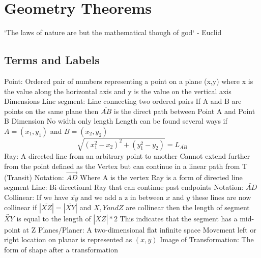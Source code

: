 \documentclass[12pt]{article}
\begin{document}
    \section {Geometry Theorems}
        `The laws of nature are but the mathematical though of god` - Euclid
        \subsection{Terms and Labels}
        \begin{outline}[enumerate]
            \1 Point: Ordered pair of numbers representing a point on a plane
                \2 (x,y) where x is the value along the horizontal axis and y is the value on the vertical axis
                 Dimensions
            \1 Line segment: Line connecting two ordered pairs
                \2 If A and B are points on the same plane then $\overline{AB}$ is the direct path between Point A and Point B
                 Dimension
                \2 No width only length
                \2 Length can be found several ways
                    \3 if $A = (x_1, y_1)$ and $B = (x_2, y_2)$
                    \begin{equation}
                        \sqrt{(x_1^2 - x_2)^2 + (y_1^2 - y_2)} = L_{\overline{AB}}
                    \end{equation}
            \1 Ray: A directed line from an arbitrary point to another
                \2 Cannot extend further from the point defined as the Vertex but can continue in a linear path from T (Transit)
                \2 Notation: $\overrightarrow{AD}$ Where A is the vertex
                \2 Ray is a form of directed line segment
            \1 Line: Bi-directional Ray that can continue past endpoints
                \2 Notation: $\overleftrightarrow{AD}$
            \1 Collinear: If we have $\overline{xy}$ and we add a z in between $x$ and $y$ these lines are now collinear
                \2 if $|\overline{XZ}| = |\overline{XY}|$ and $X, Y and Z$ are collinear then the
                length of segment $\overleftrightarrow{XY}$ is equal to the length of $|\overline{XZ}| * 2$
                \2 This indicates that the segment has a mid-point at Z
            \1 Planes/Planer: A two-dimensional flat infinite space
                \2 Movement left or right location on planar is represented as $(x, y)$
            \1 Image of Transformation: The form of shape after a transformation
        \end{outline}
\end{document}
